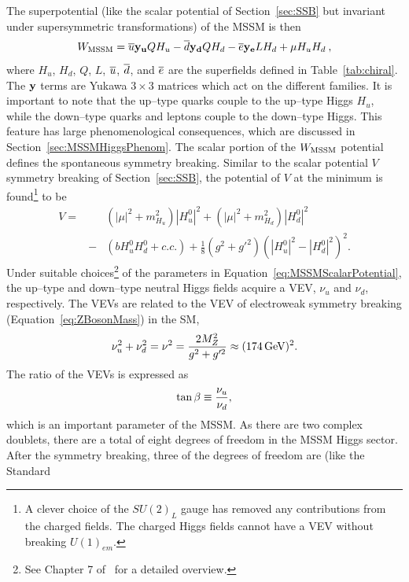 The superpotential (like the scalar potential of Section~\ref{sec:SSB} but
invariant under supersymmetric transformations) of the MSSM is
then~\cite{Martin:1997um}
\begin{equation}
  W_{\rm MSSM} =
  \overline u {\bf y_u} Q H_u -
  \overline d {\bf y_d} Q H_d -
  \overline e {\bf y_e} L H_d +
  \mu H_u H_d \>,
  \nonumber
\end{equation}
where $H_u$, $H_d$, $Q$, $L$, $\overline u$, $\overline d$, and $\overline e$ are the
superfields defined in Table~\ref{tab:chiral}.  The ${\bf y}$ terms are Yukawa
$3 \times 3$ matrices which act on the different families.  It is important to
note that the up--type quarks couple to the up--type Higgs $H_u$, while the
down--type quarks and leptons couple to the down--type Higgs.  This feature has
large phenomenological consequences, which are discussed
in Section~\ref{sec:MSSMHiggsPhenom}.  The scalar portion of the $W_{\rm MSSM}$
potential defines the spontaneous symmetry breaking.  Similar to the scalar
potential $V$ symmetry breaking of Section~\ref{sec:SSB}, the potential of $V$
at the minimum is found\footnote{A clever choice of the $SU(2)_L$ gauge has
removed any contributions from the charged fields.  The charged Higgs fields
cannot have a VEV without breaking $U(1)_{em}$.} to be 
\begin{eqnarray}
  V =& &(|\mu|^2 + m^2_{H_u})|H^0_u|^2 + (|\mu|^2 + m^2_{H_d})|H^0_d|^2
  \nonumber \\ 
   &- &(b H^0_u H^0_d + c.c.) + \frac{1}{8}(g^2 + g'^2)(|H^0_u|^2 - |H^0_d|^2)^2.
  \label{eq:MSSMScalarPotential}
\end{eqnarray}
Under suitable choices\footnote{See Chapter 7 of~\cite{Martin:1997um} for a
detailed overview.} of the parameters in Equation~\ref{eq:MSSMScalarPotential},
the up--type and down--type neutral Higgs fields acquire a VEV, $\nu_u$ and
$\nu_d$, respectively.  The VEVs are related to the VEV of electroweak
symmetry breaking (Equation~\ref{eq:ZBosonMass}) in the SM,
\begin{equation}
  \nu_u^2 + \nu_d^2 = \nu^2 = \frac{2 M_Z^2}{g^2 + g'^2} \approx (174 \,\text{Ge\hspace{-.08em}V})^2.
  \nonumber
\end{equation}
The ratio of the VEVs is expressed as
\begin{equation}
  \tan\beta \equiv \frac{\nu_u}{\nu_d},
  \nonumber
\end{equation}
which is an important parameter of the MSSM\@.  As there are two complex doublets,
there are a total of eight degrees of freedom in the MSSM Higgs sector.  After
the symmetry breaking, three of the degrees of freedom are (like the Standard
